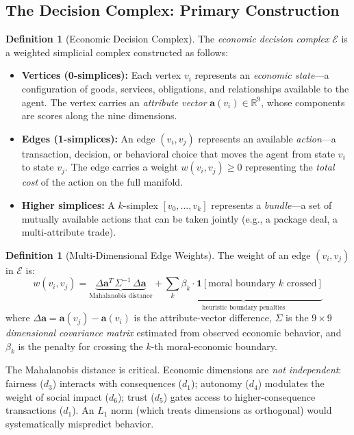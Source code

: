 \documentclass[12pt]{article}
\theoremstyle{definition}
\newtheorem{definition}[theorem]{Definition}
\theoremstyle{remark}
\newcommand{\E}{\mathcal{E}}               %
\newcommand{\R}{\mathbb{R}}
\begin{document}
\subsection{The Decision Complex: Primary Construction}

\begin{definition}[Economic Decision Complex]
\label{def:econ_complex}
The \emph{economic decision complex} $\E$ is a weighted simplicial complex constructed as follows:
\begin{itemize}
    \item \textbf{Vertices (0-simplices):} Each vertex $v_i$ represents an \emph{economic state}---a configuration of goods, services, obligations, and relationships available to the agent.  The vertex carries an \emph{attribute vector} $\mathbf{a}(v_i) \in \R^9$, whose components are scores along the nine dimensions.
    \item \textbf{Edges (1-simplices):} An edge $(v_i, v_j)$ represents an available \emph{action}---a transaction, decision, or behavioral choice that moves the agent from state $v_i$ to state $v_j$.  The edge carries a weight $w(v_i, v_j) \geq 0$ representing the \emph{total cost} of the action on the full manifold.
    \item \textbf{Higher simplices:} A $k$-simplex $[v_0, \ldots, v_k]$ represents a \emph{bundle}---a set of mutually available actions that can be taken jointly (e.g., a package deal, a multi-attribute trade).
\end{itemize}
\end{definition}

\begin{definition}[Multi-Dimensional Edge Weights]
\label{def:edge_weights}
The weight of an edge $(v_i, v_j)$ in $\E$ is:
\begin{equation}
w(v_i, v_j) = \underbrace{\Delta \mathbf{a}^T\, \Sigma^{-1}\, \Delta \mathbf{a}}_{\text{Mahalanobis distance}} + \underbrace{\sum_k \beta_k \cdot \mathbf{1}[\text{moral boundary } k \text{ crossed}]}_{\text{heuristic boundary penalties}}
\label{eq:edge_weight}
\end{equation}
where $\Delta \mathbf{a} = \mathbf{a}(v_j) - \mathbf{a}(v_i)$ is the attribute-vector difference, $\Sigma$ is the $9 \times 9$ \emph{dimensional covariance matrix} estimated from observed economic behavior, and $\beta_k$ is the penalty for crossing the $k$-th moral-economic boundary.
\end{definition}

The Mahalanobis distance is critical.  Economic dimensions are \emph{not independent}: fairness ($d_3$) interacts with consequences ($d_1$); autonomy ($d_4$) modulates the weight of social impact ($d_6$); trust ($d_5$) gates access to higher-consequence transactions ($d_1$).  An $L_1$ norm (which treats dimensions as orthogonal) would systematically mispredict behavior.
\end{document}
